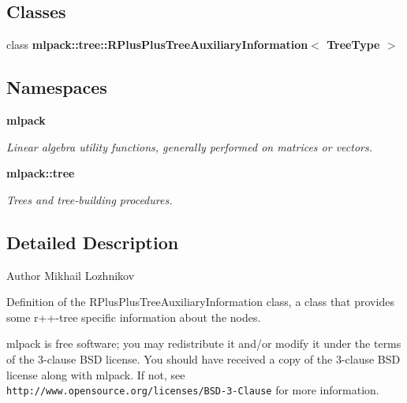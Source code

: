 \subsection*{Classes}
\begin{DoxyCompactItemize}
\item 
class {\bf mlpack\+::tree\+::\+R\+Plus\+Plus\+Tree\+Auxiliary\+Information$<$ Tree\+Type $>$}
\end{DoxyCompactItemize}
\subsection*{Namespaces}
\begin{DoxyCompactItemize}
\item 
 {\bf mlpack}
\begin{DoxyCompactList}\small\item\em Linear algebra utility functions, generally performed on matrices or vectors. \end{DoxyCompactList}\item 
 {\bf mlpack\+::tree}
\begin{DoxyCompactList}\small\item\em Trees and tree-\/building procedures. \end{DoxyCompactList}\end{DoxyCompactItemize}


\subsection{Detailed Description}
\begin{DoxyAuthor}{Author}
Mikhail Lozhnikov
\end{DoxyAuthor}
Definition of the R\+Plus\+Plus\+Tree\+Auxiliary\+Information class, a class that provides some r++-\/tree specific information about the nodes.

mlpack is free software; you may redistribute it and/or modify it under the terms of the 3-\/clause B\+SD license. You should have received a copy of the 3-\/clause B\+SD license along with mlpack. If not, see {\tt http\+://www.\+opensource.\+org/licenses/\+B\+S\+D-\/3-\/\+Clause} for more information. 